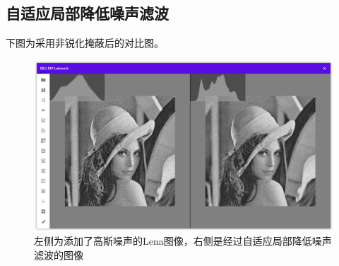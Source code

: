 \documentclass{article}
\begin{document}
\newpage

\subsection{自适应局部降低噪声滤波}

下图为采用非锐化掩蔽后的对比图。

\begin{figure}[H]
    \includegraphics[width=\textwidth]{img/alnr-filter.png}
    \caption{左侧为添加了高斯噪声的Lena图像，右侧是经过自适应局部降低噪声滤波的图像}
\end{figure}
\end{document}
